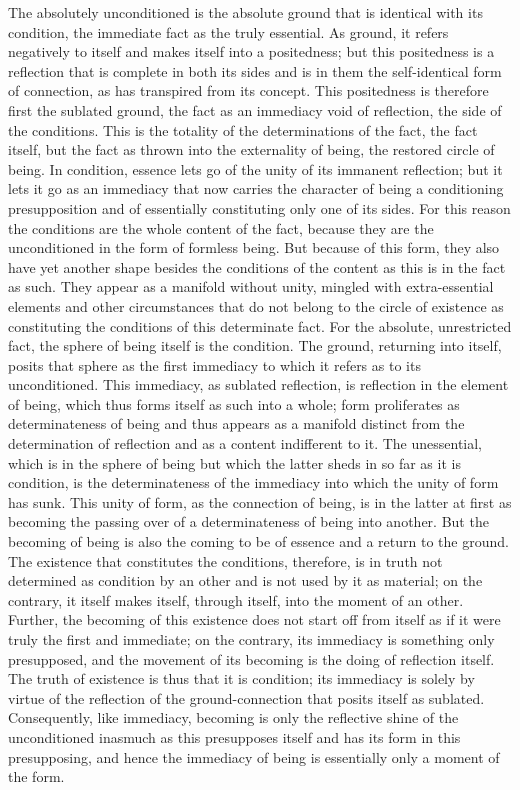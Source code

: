 The absolutely unconditioned is the absolute ground
that is identical with its condition,
the immediate fact as the truly essential.
As ground, it refers negatively to itself
and makes itself into a positedness;
but this positedness is a reflection
that is complete in both its sides
and is in them the self-identical form of connection,
as has transpired from its concept.
This positedness is therefore first the sublated ground,
the fact as an immediacy void of reflection,
the side of the conditions.
This is the totality of the determinations of the fact,
the fact itself, but the fact as thrown into
the externality of being, the restored circle of being.
In condition, essence lets go of the unity of its immanent reflection;
but it lets it go as an immediacy that now carries
the character of being a conditioning presupposition
and of essentially constituting only one of its sides.
For this reason the conditions are the whole content of the fact,
because they are the unconditioned in the form of formless being.
But because of this form, they also have yet another shape besides
the conditions of the content as this is in the fact as such.
They appear as a manifold without unity,
mingled with extra-essential elements
and other circumstances that do not belong
to the circle of existence as constituting
the conditions of this determinate fact.
For the absolute, unrestricted fact,
the sphere of being itself is the condition.
The ground, returning into itself, posits
that sphere as the first immediacy
to which it refers as to its unconditioned.
This immediacy, as sublated reflection,
is reflection in the element of being,
which thus forms itself as such into a whole;
form proliferates as determinateness of being
and thus appears as a manifold distinct from
the determination of reflection
and as a content indifferent to it.
The unessential, which is in the sphere of being
but which the latter sheds in so far as it is condition,
is the determinateness of the immediacy into which
the unity of form has sunk.
This unity of form, as the connection of being,
is in the latter at first as becoming the passing over
of a determinateness of being into another.
But the becoming of being is also the coming to be
of essence and a return to the ground.
The existence that constitutes the conditions, therefore,
is in truth not determined as condition by an other
and is not used by it as material;
on the contrary, it itself makes itself, through itself,
into the moment of an other.
Further, the becoming of this existence does not start off from itself
as if it were truly the first and immediate;
on the contrary, its immediacy
is something only presupposed, and the movement of its becoming is the
doing of reflection itself.
The truth of existence is thus that it is condition;
its immediacy is solely by virtue of the reflection of the ground-connection
that posits itself as sublated.
Consequently, like immediacy, becoming is only
the reflective shine of the unconditioned
inasmuch as this presupposes itself
and has its form in this presupposing,
and hence the immediacy of being is essentially
only a moment of the form.

